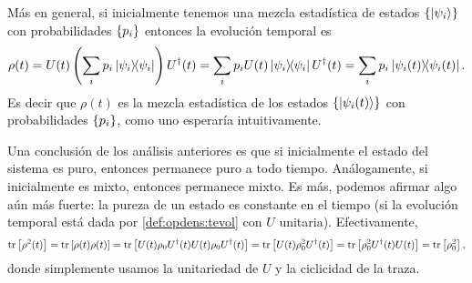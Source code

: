\documentclass[10pt, a4paper]{article}
\numberwithin{equation}{subsection}
\begin{document}
Más en general, si inicialmente tenemos una mezcla estadística de estados
$\set{\ket{\psi_i}}$ con probabilidades $\set{p_i}$ entonces la evolución
temporal es
\begin{equation}
  \rho(t)
  = U(t)\left(\sum_ip_i\projector{\psi_i}\right)U^\dagger(t)
  = \sum_ip_iU(t)\projector{\psi_i}U^\dagger(t)
  = \sum_ip_i\projector{\psi_i(t)}.
\end{equation}
Es decir que $\rho(t)$ es la mezcla estadística de los estados
$\set{\ket{\psi_i(t)}}$ con probabilidades $\set{p_i}$, como uno esperaría
intuitivamente.

\bigbreak

Una conclusión de los análisis anteriores es que si inicialmente el estado del
sistema es puro, entonces permanece puro a todo tiempo. Análogamente, si
inicialmente es mixto, entonces permanece mixto. Es más, podemos afirmar algo
aún más fuerte: la pureza de un estado es constante en el tiempo (si la
evolución temporal está dada por \eqref{def:opdens:tevol} con $U$ unitaria).
Efectivamente,
\begin{equation}
  \tr\left[\rho^2(t)\right]
  = \tr\left[\rho(t)\rho(t)\right]
  = \tr\left[U(t)\rho_0U^\dagger(t)U(t)\rho_0U^\dagger(t)\right]
  = \tr\left[U(t)\rho_0^2U^\dagger(t)\right]
  = \tr\left[\rho_0^2U^\dagger(t)U(t)\right]
  = \tr\left[\rho_0^2\right],
\end{equation}
donde simplemente usamos la unitariedad de $U$ y la ciclicidad de la traza.

\end{document}

